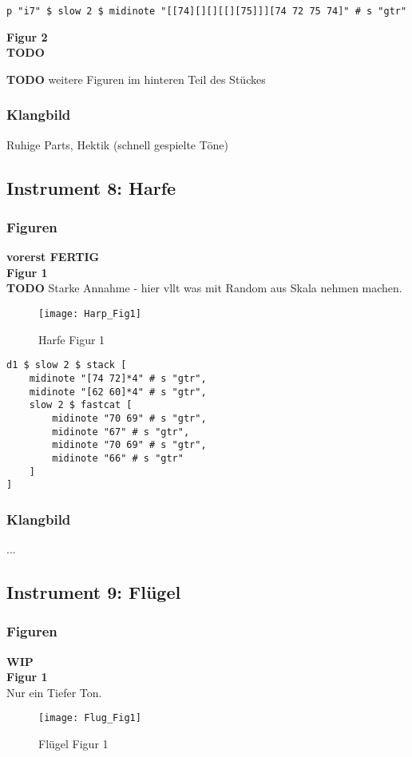 \documentclass[
10pt, %
a4paper, %
oneside, %
headinclude,footinclude, %
BCOR5mm, %
]{scrartcl}
\begin{document}
\begin{lstlisting}
p "i7" $ slow 2 $ midinote "[[74][][][[][75]]][74 72 75 74]" # s "gtr"
\end{lstlisting}

\noindent\textbf{Figur 2}\\
{\color{red}\textbf{TODO}} 


{\color{red}\textbf{TODO}} weitere Figuren im hinteren Teil des Stückes

\subsubsection{Klangbild}
Ruhige Parts, Hektik (schnell gespielte Töne)


\subsection{Instrument 8: Harfe}
\subsubsection{Figuren}
{\color{green}\textbf{vorerst FERTIG}} \\
\noindent\textbf{Figur 1}\\
{\color{red}\textbf{TODO}} Starke Annahme - hier vllt was mit Random aus Skala nehmen machen.
\begin{figure}[h]
	\centering 
	\texttt{[image: Harp\_Fig1]} 
	\caption{Harfe Figur 1}
\end{figure}

\begin{lstlisting}
d1 $ slow 2 $ stack [
	midinote "[74 72]*4" # s "gtr", 
	midinote "[62 60]*4" # s "gtr", 
	slow 2 $ fastcat [
		midinote "70 69" # s "gtr", 
		midinote "67" # s "gtr",
		midinote "70 69" # s "gtr", 
		midinote "66" # s "gtr"    
	]
]
\end{lstlisting}



\subsubsection{Klangbild}
...

\subsection{Instrument 9: Flügel}
\subsubsection{Figuren}
{\color{orange}\textbf{WIP}} \\
\noindent\textbf{Figur 1}\\
Nur ein Tiefer Ton.
\begin{figure}[h]
	\centering 
	\texttt{[image: Flug\_Fig1]} 
	\caption{Flügel Figur 1}
\end{figure}
\end{document}
